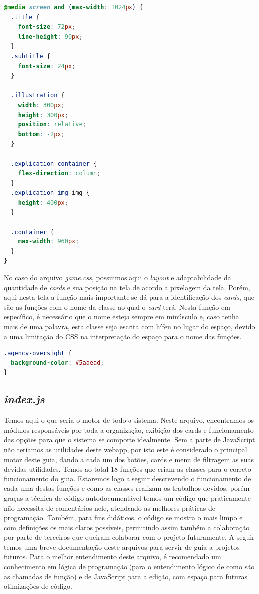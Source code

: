\begin{lstlisting}[language=css, caption=Exemplo de código que apresenta a adaptabilidade do sistema de acordo a pixelagem disponível da tela]
@media screen and (max-width: 1024px) {
  .title {
    font-size: 72px;
    line-height: 90px;
  }
  .subtitle {
    font-size: 24px;
  }

  .illustration {
    width: 300px;
    height: 300px;
    position: relative;
    bottom: -2px;
  }

  .explication_container {
    flex-direction: column;
  }
  .explication_img img {
    height: 400px;
  }

  .container {
    max-width: 960px;
  }
}
\end{lstlisting}

No caso do arquivo \textit{game.css}, possuimos aqui o \textit{layout} e adaptabilidade da quantidade de \textit{cards} e sua posição na tela de acordo a pixelagem da tela. Porém, aqui nesta tela a função mais importante se dá para a identificação dos \textit{cards}, que são as funções com o nome da classe ao qual o \textit{card} terá. Nesta função em específico, é necessário que o nome esteja sempre em minúsculo e, caso tenha mais de uma palavra, esta classe seja escrita com hífen no lugar do espaço, devido a uma limitação do \acrshort{CSS} na interpretação do espaço para o nome das funções.
\begin{lstlisting}[language=css, caption=Exemplo de carta do tipo \textit{Agency \& Oversight} contendo nome composto.]
.agency-oversight {
  background-color: #5aaead;
}
\end{lstlisting}


\subsection{\textit{index.js}}
\label{index.js}
Temos aqui o que seria o motor de todo o sistema. Neste arquivo, encontramos os módulos responsáveis por toda a organização, exibição dos cards e funcionamento das opções para que o sistema se comporte idealmente. Sem a parte de JavaScript não teríamos as utilidades deste webapp, por isto este é considerado o principal motor deste guia, dando a cada um dos botões, cards e menu de filtragem as suas devidas utilidades. Temos ao total 18 funções que criam as classes para o correto funcionamento do guia. Estaremos logo a seguir descrevendo o funcionamento de cada uma destas funções e como as classes realizam os trabalhos devidos, porém graças a técnica de código autodocumentável temos um código que praticamente não necessita de comentários nele, atendendo as melhores práticas de programação. Também, para fins didáticos, o código se mostra o mais limpo e com definições os mais claros possíveis, permitindo assim também a colaboração por parte de terceiros que queiram colaborar com o projeto futuramente. A seguir temos uma breve documentação deste arquivos para servir de guia a projetos futuros. Para o melhor entendimento deste arquivo, é recomendado um conhecimento em lógica de programação (para o entendimento lógico de como são as chamadas de função) e de JavaScript para a edição, com espaço para futuras otimizações de código.

